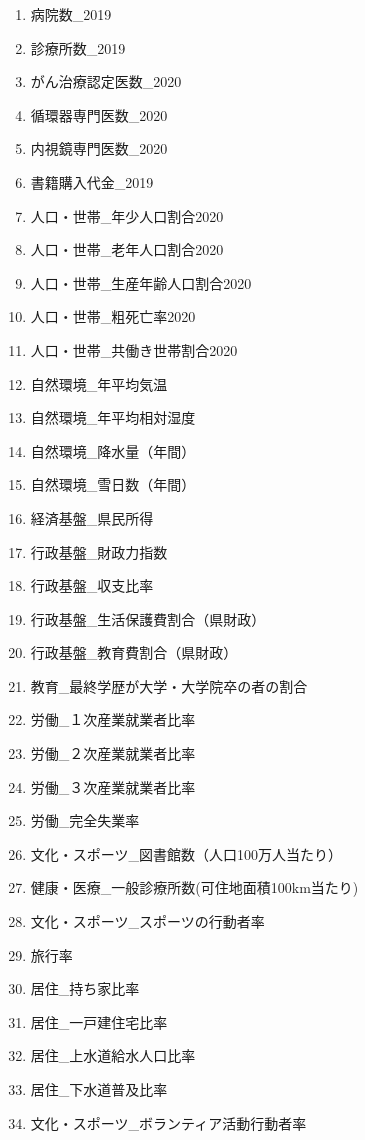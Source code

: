 \begin{multicols}{2}
\begin{enumerate}
  \item  病院数\_2019
  \item  診療所数\_2019
  \item  がん治療認定医数\_2020
  \item  循環器専門医数\_2020
  \item  内視鏡専門医数\_2020
  \item  書籍購入代金\_2019
  \item  人口・世帯\_年少人口割合2020
  \item  人口・世帯\_老年人口割合2020
  \item  人口・世帯\_生産年齢人口割合2020
  \item  人口・世帯\_粗死亡率2020
  \item  人口・世帯\_共働き世帯割合2020
  \item  自然環境\_年平均気温
  \item  自然環境\_年平均相対湿度
  \item  自然環境\_降水量（年間）
  \item  自然環境\_雪日数（年間）
  \item  経済基盤\_県民所得
  \item  行政基盤\_財政力指数
  \item  行政基盤\_収支比率
  \item  行政基盤\_生活保護費割合（県財政）
  \item  行政基盤\_教育費割合（県財政）
  \item  教育\_最終学歴が大学・大学院卒の者の割合
  \item  労働\_１次産業就業者比率
  \item  労働\_２次産業就業者比率
  \item  労働\_３次産業就業者比率
  \item  労働\_完全失業率
  \item  文化・スポーツ\_図書館数（人口100万人当たり）
  \item  健康・医療\_一般診療所数(可住地面積100km当たり)
  \item  文化・スポーツ\_スポーツの行動者率
  \item  旅行率
  \item  居住\_持ち家比率
  \item  居住\_一戸建住宅比率
  \item  居住\_上水道給水人口比率
  \item  居住\_下水道普及比率
  \item  文化・スポーツ\_ボランティア活動行動者率

\end{enumerate}
\end{multicols}
